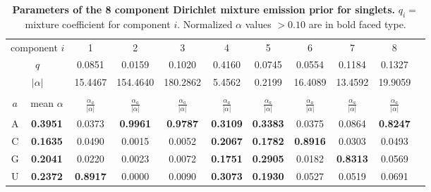 \documentclass[11pt]{article}
\begin{document}
\begin{table}
\footnotesize
\begin{center}
\begin{tabular}{|c|c|c|c|c|c|c|c|c|c|c|} \hline
\multicolumn{2}{|c|}{component $i$} & 1 & 2 & 3 & 4 & 5 & 6 & 7 & 8 \\
\multicolumn{2}{|c|}{$q$} & 0.0851 & 0.0159 & 0.1020 & 0.4160 & 0.0745 & 0.0554 & 0.1184 & 0.1327 \\  
\multicolumn{2}{|c|}{$|\alpha|$} & 15.4467 & 154.4640 & 180.2862 & 5.4562 & 0.2199 & 16.4089 & 13.4592 & 19.9059 \\ \hline 
\multicolumn{10}{c}{} \\ \hline

$a$ & mean $\alpha$ & $\frac{\alpha_a}{|\alpha|}$ & $\frac{\alpha_a}{|\alpha|}$ & $\frac{\alpha_a}{|\alpha|}$ & $\frac{\alpha_a}{|\alpha|}$ & $\frac{\alpha_a}{|\alpha|}$ & $\frac{\alpha_a}{|\alpha|}$ & $\frac{\alpha_a}{|\alpha|}$ & $\frac{\alpha_a}{|\alpha|}$ \\ \hline 
A & \textbf{0.3951} & 0.0373 & \textbf{0.9961} & \textbf{0.9787} & \textbf{0.3109} & \textbf{0.3383} & 0.0375 & 0.0864 & \textbf{0.8247} \\  
C & \textbf{0.1635} & 0.0490 & 0.0015 & 0.0052 & \textbf{0.2067} & \textbf{0.1782} & \textbf{0.8916} & 0.0303 & 0.0493 \\  
G & \textbf{0.2041} & 0.0220 & 0.0023 & 0.0072 & \textbf{0.1751} & \textbf{0.2905} & 0.0182 & \textbf{0.8313} & 0.0569 \\  
U & \textbf{0.2372} & \textbf{0.8917} & 0.0000 & 0.0090 & \textbf{0.3073} & \textbf{0.1930} & 0.0527 & 0.0519 & 0.0691 \\ \hline 


\end{tabular}
\end{center}

\normalfont\rmfamily
\caption{\textbf{Parameters of the 8 component Dirichlet mixture
    emission prior for singlets.} $q_i =$ mixture coefficient for
    component $i$. Normalized $\alpha$ values $> 0.10$ are in bold
    faced type.}
\label{tbl:singlets}
\end{table}
\fi
\end{document}
